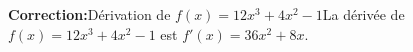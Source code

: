 \documentclass{standalone}
\begin{document}
\begin{minipage}{\textwidth}
\textbf{Correction:}Dérivation de $f(x) = 12x^3 + 4x^2 - 1$\newline La dérivée de $f(x) = 12x^3 + 4x^2 - 1$ est $f'(x) = 36x^2 + 8x$.
\end{minipage}
\end{document}
